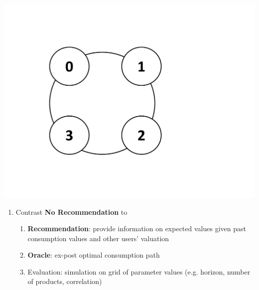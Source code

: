 \documentclass[8pt, aspectratio=43,usenames,dvipsnames]{beamer} %
\begin{document}
{\begin{frame}
\begin{minipage}{.75\textwidth}
\begin{enumerate}
\end{enumerate}
\end{minipage}
\begin{minipage}{.24\textwidth}
~\\[15pt]
\includegraphics[width=.9\textwidth]{circle.pdf}
\end{minipage}
\begin{enumerate}
\itemsep=1.5em
\setlength{\itemindent}{-1.25em}
\item Contrast \textbf{\color{mycolor1}No Recommendation} to
	\begin{enumerate}
	\vspace{.5em}
	\itemsep=.8em
	\setlength{\itemindent}{-3em}
	\normalsize
	\item \textbf{\color{mycolor2}Recommendation}: provide information on expected values given past consumption values and other users' valuation
	\item \textbf{\color{mycolor3}Oracle}: ex-post optimal consumption path
	\item Evaluation: simulation on grid of parameter values (e.g. horizon, number of products, correlation)
	\end{enumerate}
\end{enumerate}
\end{frame}

}
\end{document}
